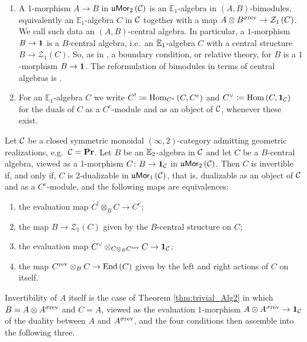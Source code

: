 \begin{nota}
\begin{enumerate}
\item A 1-morphism $A\rightarrow B$ in $\mathfrak{u}\mathsf{Mor}_2\left(\mathcal{C}\right)$ is an $\mathbb{E}_1$-algebra in
$\left(A , B\right)$-bimodules, equivalently an $\mathbb{E}_1$-algebra $C$ in $\mathcal{C}$
together with a map $A\otimes B^{\sigma\text{rev}}\rightarrow \mathcal{Z}_1\left(C\right)$.
We call such data an $\left(A,B\right)$-central algebra. In particular, a $1$-morphism $B\to\mathbf{1}$ is a
$B$-central algebra, i.e.\ an $\mathbb{E}_1$-algebra $C$ with a central structure $B\to \mathcal{Z}_1\left(C\right)$.
So, as in \cite{BJSS, SSS}, a boundary condition, or relative theory, for $B$ is a
$1$-morphism $B\to\mathbf{1}$. The reformulation of bimodules in terms of central algebras is
\cite[Section 5.3.1]{L:HA}.

\item For an $\mathbb{E}_1$-algebra $C$ we write $C^{!}\coloneqq \mathrm{Hom}_{C^e}\left(C,C^e\right)$
and $C^\vee \coloneqq \operatorname{Hom}\left(C , \mathbf{1}_{\mathcal{C}}\right)$ for the duals of $C$
as a $C^e$-module and as an object of $\mathcal{C}$, whenever these exist.
\end{enumerate}
\end{nota}

\begin{theorem}
\label{thm:trivial_Alg2}
Let $\mathcal{C}$ be a closed symmetric monoidal $\left(\infty,2\right)$-category admitting geometric
realizations, e.g.\ $\mathcal{C}=\mathbf{Pr}$.
Let $B$ be an $\mathbb{E}_2$-algebra in $\mathcal{C}$ and let $C$ be a $B$-central algebra, viewed as a
1-morphism $C\colon B\to\mathbf{1}_{\mathcal{C}}$ in $\mathfrak{u}\mathsf{Mor}_2\left(\mathcal{C}\right)$. Then $C$ is invertible if,
and only if, $C$ is 2-dualizable in $\mathfrak{u}\mathsf{Mor}_1\left(\mathcal{C}\right)$, that is, dualizable as an object of
$\mathcal{C}$ and as a $C^e$-module, and the following maps are equivalences:
\begin{enumerate}
    \item the evaluation map $C^{!}\otimes_B C\to C^e$;
    \item the map $B\to \mathcal{Z}_1\left(C\right)$ given by the $B$-central structure on $C$;
    \item the evaluation map $C^{\vee}\otimes_{C\otimes_B C^{\text{rev}}}C\to \mathbf{1}_{\mathcal{C}}$;
    \item the map $C^{\text{rev}}\otimes_B C\to \mathrm{End}\left(C\right)$ given by the left and
    right actions of $C$ on itself.
\end{enumerate}
\end{theorem}

Invertibility of $A$ itself is the case of Theorem \ref{thm:trivial_Alg2} in which
$B = A\otimes A^{\sigma\text{rev}}$ and $C = A$, viewed as the evaluation $1$-morphism
$A\otimes A^{\sigma\text{rev}}\to\mathbf{1}_{\mathcal{C}}$ of the duality between $A$ and $A^{\sigma\text{rev}}$, and the four conditions then assemble into the following three.

